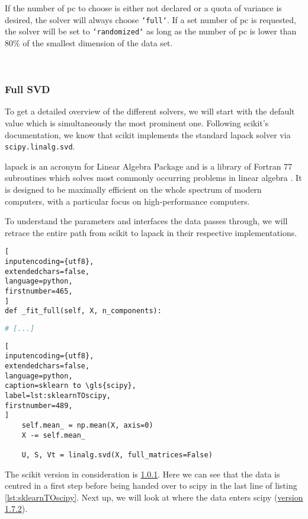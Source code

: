 If the number of \gls{pc} to choose is either not declared or a quota of variance is desired, the solver will always choose \texttt{`full`}.
If a set number of \gls{pc} is requested, the solver will be set to \texttt{`randomized`} as long as the number of \gls{pc} is lower than 80\% of the smallest dimension of the data set.


\ \clearpage


\subsubsection{Full SVD} \label{sec:fullSVD}

To get a detailed overview of the different solvers, we will start with the default value which is simultaneously the most prominent one.
Following \gls{scikit}'s documentation, we know that \gls{scikit} implements the standard \acrshort{lapack} solver via \texttt{scipy.linalg.svd}.
\bigskip

\acrshort{lapack} is an acronym for Linear Algebra Package and is a library of Fortran 77 subroutines which solves most commonly occurring problems in linear algebra \cite{anderson1999lapack}.
It is designed to be maximally efficient on the whole spectrum of modern computers, with a particular focus on high-performance computers.

To understand the parameters and interfaces the data passes through, we will retrace the entire path from \gls{scikit} to \acrshort{lapack} in their respective implementations.


\begin{lstlisting}[
inputencoding={utf8}, 
extendedchars=false, 
language=python,
firstnumber=465,
]
def _fit_full(self, X, n_components):
\end{lstlisting}
%
%
%
\spacingConcatLists
\begin{lstlisting}[language=python, numbers=none]
     # [...]
\end{lstlisting}
%
%
%
\spacingConcatLists
\begin{lstlisting}[
inputencoding={utf8}, 
extendedchars=false, 
language=python, 
caption=sklearn to \gls{scipy}, 
label=lst:sklearnTOscipy,
firstnumber=489,
]
    self.mean_ = np.mean(X, axis=0)
    X -= self.mean_

    U, S, Vt = linalg.svd(X, full_matrices=False)
\end{lstlisting}



\noindent
The \gls{scikit} version in consideration is \href{\scikitPCAvIxOxI{_pca}}{1.0.1}.
Here we can see that the data is centred in a first step before being handed over to \gls{scipy} in the last line of listing \ref{lst:sklearnTOscipy}.
Next up, we will look at where the data enters \gls{scipy} (\href{\scipyvIxVIIxII{decomp_svd}}{version 1.7.2}).



